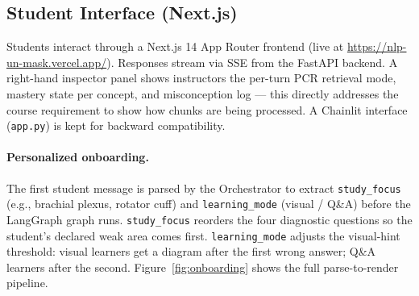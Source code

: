 \documentclass[11pt]{article}
\begin{document}
\subsection{Student Interface (Next.js)}

Students interact through a Next.js 14 App Router frontend (live at
\url{https://nlp-un-mask.vercel.app/}).
Responses stream via SSE from the FastAPI backend.
A right-hand inspector panel shows instructors the per-turn PCR retrieval mode,
mastery state per concept, and misconception log --- this directly addresses
the course requirement to show how chunks are being processed.
A Chainlit interface (\texttt{app.py}) is kept for backward compatibility.

\paragraph{Personalized onboarding.}
The first student message is parsed by the Orchestrator to extract
\texttt{study\_focus} (e.g., brachial plexus, rotator cuff) and
\texttt{learning\_mode} (visual / Q\&A) before the LangGraph graph runs.
\texttt{study\_focus} reorders the four diagnostic questions so the
student's declared weak area comes first.
\texttt{learning\_mode} adjusts the visual-hint threshold:
visual learners get a diagram after the first wrong answer;
Q\&A learners after the second.
Figure~\ref{fig:onboarding} shows the full parse-to-render pipeline.
\end{document}
